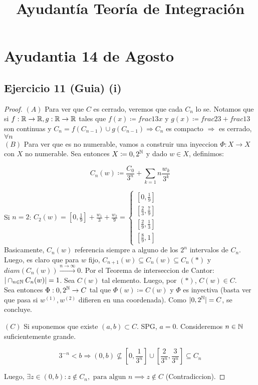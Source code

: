\documentclass[a4paper]{report}
\title{Ayudantía Teoría de Integración}
\author{}
\begin{document}
\maketitle
\tableofcontents

\section{Ayudantia 14 de Agosto}

\subsection{Ejercicio 11 (Guia) (i)}  

\begin{proof}
	$(A)$ Para ver que $C$ es cerrado, veremos que cada $C_n$ lo se. Notamos que si $f:\mathbb{R} \to \mathbb{R}, g:\mathbb{R}\to\mathbb{R}$ tales que $f(x)\coloneqq frac{1}{3} x$ y $g(x)\coloneqq frac{2}{3} + frac{1}{3}$ son continuas y $C_n=f(C_{n-1})\cup g(C_{n-1})\Rightarrow C_n$ es compacto $\Rightarrow$ es cerrado, $\forall n$ \\

	$(B)$ Para ver que es no numerable, vamos a construir una inyeccion $\Phi : X\to X$ con $X$ no numerable. Sea entonces $X\coloneqq {0,2}^{\mathbb{N}}$ y dado $w\in X$, definimos:

	\[
		C_n(w)\coloneqq\frac{C_0}{3^n} + \sum_{k=1}{n}\frac{w_k}{3^k}
	\]

	Si $n=2$: $C_2(w) = [0,\frac{1}{9}] + \frac{w_1}{3} + \frac{w_2}{9} = \begin{cases}
		[0,\frac{1}{9}] \\
		[\frac{2}{3},\frac{7}{9}] \\
		[\frac{2}{9},\frac{1}{3}] \\
		[\frac{8}{9},1]
	\end{cases}$ \\

	Basicamente, $C_n(w)$ referencia siempre a alguno de los $2^n$ intervalos de $C_n$. Luego, es claro que para $w$ fijo, $C_{n+1}(w)\subseteq C_n(w)\subseteq C_n (*)$ y $diam(C_n(w))\xrightarrow{n\to\infty} 0$. Por el Teorema de interseccion de Cantor: $|\cap_{n\in\mathbb{N}} C_n(w)|=1$. Sea $C(w)$ tal elemento. Luego, por $(*)$, $C(w)\in C$. \\

	Sea entonces $\Phi : {0,2}^{\mathbb{N}}\to C$ tal que $\Phi(w)\coloneqq C(w)$ y $\Phi$ es inyectiva (basta ver que pasa si $w^{(1)},w^{(2)}$ difieren en una coordenada). Como $|{0,2}^{\mathbb{N}}|=C$, se concluye.

	$(C)$ Si suponemos que existe $(a,b)\subset C$. SPG, $a=0$. Consideremos $n\in\mathbb{N}$ suficientemente grande.

	\[
	3^{-n}<b  \Rightarrow (0,b) \nsubseteq [0,\frac{1}{3^n}]\cup[\frac{2}{3^n},\frac{3}{3^n}]\subseteq C_n
	\]

	Luego, $\exists z \in (0,b): z\not\in C_n, \text{ para algun } n \implies z\not\in C$ (Contradiccion).
\end{proof}
\end{document}
